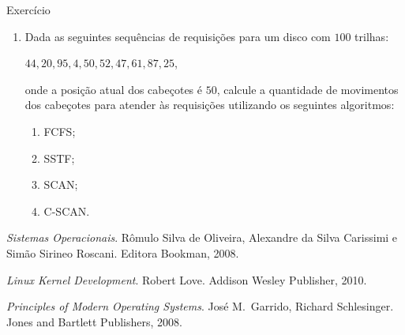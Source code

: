 \documentclass{beamer}
\begin{document}
\begin{frame}{Exercício}

  \begin{enumerate}
  \item Dada as seguintes sequências de requisições para um 
    disco com $100$ trilhas:
    \begin{center}
      $44, 20, 95, 4, 50, 52, 47, 61, 87, 25$,
    \end{center}
    onde a posição atual dos cabeçotes é $50$, calcule a
    quantidade de movimentos dos cabeçotes para atender às
    requisições utilizando os seguintes algoritmos:
    \begin{enumerate}
    \item FCFS;
    \item SSTF;
    \item SCAN;
    \item C-SCAN.
    \end{enumerate}
  \end{enumerate}
  
\end{frame}

\begin{frame}
  
  \begin{thebibliography}{5}
    {\em Sistemas Operacionais}.
    \newblock Rômulo Silva de Oliveira, Alexandre da Silva Carissimi e 
    Simão Sirineo Roscani.
    \newblock Editora Bookman, 2008.
  
    {\em Linux Kernel Development}.
    \newblock Robert Love.
    \newblock Addison Wesley Publisher, 2010.

      {\em Principles of Modern Operating Systems}.
      \newblock José M.\ Garrido, Richard Schlesinger.
      \newblock Jones and Bartlett Publishers, 2008.

  \end{thebibliography}

\end{frame}
\end{document}
